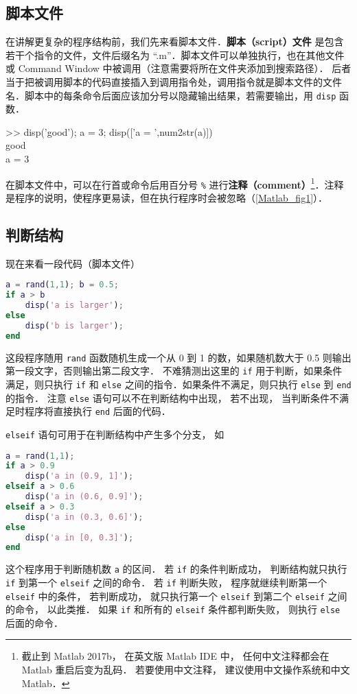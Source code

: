

\subsection{脚本文件}
在讲解更复杂的程序结构前，我们先来看脚本文件．\textbf{脚本（script）文件} 是包含若干个指令的文件，文件后缀名为 “.m”．脚本文件可以单独执行，也在其他文件或 Command Window 中被调用（注意需要将所在文件夹添加到搜索路径）． 后者当于把被调用脚本的代码直接插入到调用指令处，调用指令就是脚本文件的文件名．脚本中的每条命令后面应该加分号以隐藏输出结果，若需要输出，用 \texttt{disp} 函数．
\begin{Command}
>> disp('good'); a = 3; disp(['a = ',num2str(a)]) \\
good \\
a = 3
\end{Command}

在脚本文件中，可以在行首或命令后用百分号 \texttt{\%} 进行\textbf{注释（comment）}\footnote{截止到 Matlab 2017b， 在英文版 Matlab IDE 中， 任何中文注释都会在 Matlab 重启后变为乱码． 若要使用中文注释， 建议使用中文操作系统和中文 Matlab．}．注释是程序的说明，使程序更易读，但在执行程序时会被忽略（\autoref{Matlab_fig1}）．

\subsection{判断结构}
现在来看一段代码（脚本文件）
\begin{lstlisting}[language=Matlab]
a = rand(1,1); b = 0.5;
if a > b
    disp('a is larger');
else
    disp('b is larger');
end
\end{lstlisting}
这段程序随用 \texttt{rand} 函数随机生成一个从 0 到 1 的数，如果随机数大于 0.5 则输出第一段文字，否则输出第二段文字． 不难猜测出这里的 \texttt{if} 用于判断，如果条件满足，则只执行 \texttt{if} 和 \texttt{else} 之间的指令．如果条件不满足，则只执行 \texttt{else} 到 \texttt{end} 的指令． 注意 \texttt{else} 语句可以不在判断结构中出现， 若不出现， 当判断条件不满足时程序将直接执行 \texttt{end} 后面的代码．

\texttt{elseif} 语句可用于在判断结构中产生多个分支， 如
\begin{lstlisting}[language=Matlab]
a = rand(1,1);
if a > 0.9
    disp('a in (0.9, 1]');
elseif a > 0.6
    disp('a in (0.6, 0.9]');
elseif a > 0.3
    disp('a in (0.3, 0.6]');
else
    disp('a in [0, 0.3]');
end
\end{lstlisting}
这个程序用于判断随机数 \texttt{a} 的区间． 若 \texttt{if} 的条件判断成功， 判断结构就只执行 \texttt{if} 到第一个 \texttt{elseif} 之间的命令． 若 \texttt{if} 判断失败， 程序就继续判断第一个 \texttt{elseif} 中的条件， 若判断成功， 就只执行第一个 \texttt{elseif} 到第二个 \texttt{elseif} 之间的命令， 以此类推． 如果 \texttt{if} 和所有的 \texttt{elseif} 条件都判断失败， 则执行 \texttt{else} 后面的命令．

